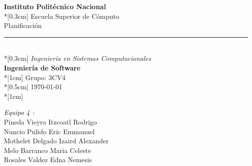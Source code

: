 
\begin{titlepage}


        \begin{center}
            \LARGE \textbf{Instituto Politécnico Nacional}\\*[0.3cm]
            \Large {Escuela Superior de Cómputo}\\
            \vspace{1cm}
            \Large {Planificación}\\
            \rule{12cm}{0.5mm}\\*[0.3cm]%
            \hspace{0.9cm} 
            \normalsize {\textit{Ingeniería en Sistemas Computacionales}}\\
            \Large {\bf Ingeniería de Software}\\*[1cm]
            \large {Grupo: 3CV4 }\\*[0.5cm]
            \large {\today}\\*[1cm]
        \end{center}

    \centering %

    




    \vspace{1cm} %

   \textit{Equipo 4 :}\\ 
     Pineda Vieyra Itzcoatl Rodrigo \\
     Nuncio Pulido Eric Emmanuel\\
     Mothelet Delgado Izaird Alexander\\
      Melo Barranco Maria Celeste\\
      Rosales Valdez Edna Nemesis



    \vspace{1cm} %


\end{titlepage}
